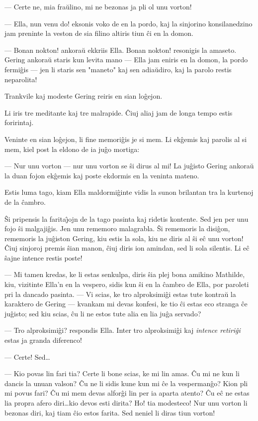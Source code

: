  --- Certe ne, mia fra\u ulino, mi ne bezonas ja pli ol unu vorton!


 --- Ella, nun venu do! eksonis voko de en la pordo, kaj la sinjorino
konsilanedzino jam preninte la veston de sia filino altiris tiun
\^ci en la domon.

 --- Bonan nokton! ankora\u u ekkriis Ella. Bonan nokton! resonigis la
amaseto. Gering ankora\u u staris kun levita mano --- Ella jam
eniris en la domon, la pordo fermi\^gis --- jen li staris sen
"maneto" kaj sen adia\u udiro, kaj la parolo restis neparolita!

   Trankvile kaj modeste Gering reiris en sian lo\^gejon.

   Li iris tre meditante kaj tre malrapide. \^Ciuj aliaj jam de longa
tempo estis foririntaj.

   Veninte en sian lo\^gejon, li fine memori\^gis je si mem. Li ek\^gemis
kaj parolis al si mem, kiel post la eldono de ia ju\^go mortiga:

 --- Nur unu vorton --- nur unu vorton se \^si dirus al mi! La ju\^gisto
Gering ankora\u u la duan fojon ek\^gemis kaj poste ekdormis en la
veninta mateno.

   Estis luma tago, kiam Ella maldormi\^ginte vidis la sunon brilantan
tra la kurtenoj de la \^cambro.

   \^Si pripensis la farita\^{\j}ojn de la tago pasinta kaj ridetis kontente.
Sed jen per unu fojo \^si malgaji\^gis. Jen unu rememoro malagrabla.
\^Si rememoris la disi\^gon, rememoris la ju\^giston Gering, kiu
estis la sola, kiu ne diris al \^si e\^c unu vorton! \^Ciuj sinjoroj
premis \^sian manon, \^ciuj diris ion amindan, sed li sola silentis.
Li e\^c \^sajne intence restis poste!

 --- Mi tamen kredas, ke li estas senkulpa, diris \^sia plej bona
amikino Mathilde, kiu, vizitinte Ella'n en la vespero, sidis kun
\^si en la \^cambro de Ella, por paroleti pri la dancado pasinta.
--- Vi scias, ke tro alproksimi\^gi estas tute kontra\u u la
karaktero de Gering --- kvankam mi devas konfesi, ke tio \^ci estas
eco stranga \^ce ju\^gisto; sed kiu scias, \^cu li ne estos tute
alia en lia ju\^ga servado?

 --- Tro alproksimi\^gi? respondis Ella. Inter tro alproksimi\^gi kaj
{\sl intence retiri\^gi} estas ja granda diferenco!

 --- Certe! Sed\dots

 --- Kio povas lin fari tia? Certe li bone scias, ke mi lin amas. \^Cu
mi ne kun li dancis la unuan valson? \^Cu ne li sidis kune kun mi
\^ce la vesperman\^go? Kion pli mi povus fari? \^Cu mi mem devas
alfor\^gi lin per ia aparta atento? \^Cu e\^c ne estas lia propra
afero diri\dots kio devos esti dirita? Ho! tia modesteco! Nur unu
vorton li bezonas diri, kaj tiam \^cio estos farita. Sed neniel li
diras tiun vorton!

